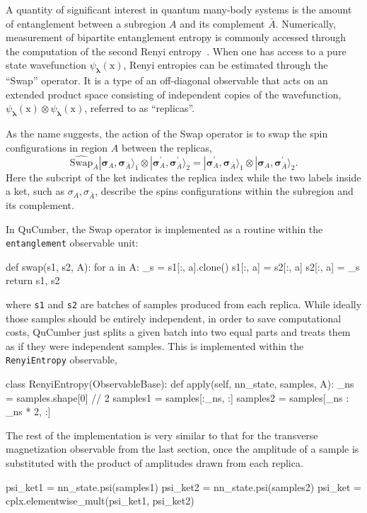 \documentclass[submission, Phys, hidelnks]{SciPost}
\newcommand{\x}{\bm{\mathrm{x}}}
\begin{document}
A quantity of significant interest in quantum many-body systems is the amount of
entanglement between a subregion $A$ and its complement $\bar{A}$.
Numerically, measurement of bipartite entanglement entropy is commonly accessed
through the computation of the second Renyi entropy~\cite{Swap}.
When one has access to a pure state wavefunction $\psi_{\bm{\lambda}}(\x)$,
Renyi entropies can be estimated through the ``Swap'' operator.  It is a type of
an off-diagonal observable that acts on an extended product space consisting of
independent copies of the wavefunction,
$\psi_{\bm{\lambda}}(\x) \otimes \psi_{\bm{\lambda}}(\x)$, referred to as
``replicas''.

As the name suggests, the action of the Swap operator is to swap the spin
configurations in region $A$ between the replicas,
\begin{equation}
  \widehat{\textrm{Swap}}_A |\bm{\sigma}_A, \bm{\sigma}_{\bar A}\rangle_1 \otimes  |\bm{\sigma}^{\prime}_A, \bm{\sigma}^{\prime}_{\bar A}\rangle_2 = |\bm{\sigma}^{\prime}_A, \bm\sigma_{\bar A}\rangle_1 \otimes  |\bm\sigma_A, \bm\sigma^{\prime}_{\bar A}\rangle_2 .
\end{equation}
Here the subcript of the ket indicates the replica index while the two labels
inside a ket, such as $\sigma_A, \sigma_{\bar A}$, describe the spins
configurations within the subregion and its complement.

In QuCumber, the Swap operator is implemented as a routine within the
\verb|entanglement| observable unit:
\begin{python}
def swap(s1, s2, A):
    for a in A:
        _s = s1[:, a].clone()
        s1[:, a] = s2[:, a]
        s2[:, a] = _s
    return s1, s2
\end{python}
where \verb|s1| and \verb|s2| are batches of samples produced from each replica.
While ideally those samples should be entirely independent, in order to save
computational costs, QuCumber just splits a given batch into two equal parts and
treats them as if they were independent samples. This is implemented within the
\verb|RenyiEntropy| observable,
\begin{python}
class RenyiEntropy(ObservableBase):
    def apply(self, nn_state, samples, A):
        _ns = samples.shape[0] // 2
        samples1 = samples[:_ns, :]
        samples2 = samples[_ns : _ns * 2, :]
\end{python}
The rest of the implementation is very similar to that for the transverse
magnetization observable from the last section, once the amplitude of a sample
is substituted with the product of amplitudes drawn from each replica.
\begin{python}
psi_ket1 = nn_state.psi(samples1)
psi_ket2 = nn_state.psi(samples2)
psi_ket = cplx.elementwise_mult(psi_ket1, psi_ket2)
\end{python}
\end{document}
